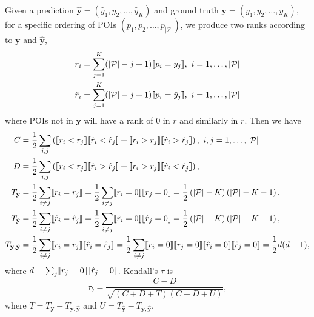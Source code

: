 Given a prediction $\hat{\mathbf{y}} = (\hat{y}_1, \hat{y}_2, \dots, \hat{y}_K)$ and ground truth $\mathbf{y} = (y_1, y_2, \dots, y_K)$,
for a specific ordering of POIs $(p_1, p_2, \dots, p_{|\mathcal{P}|})$,
we produce two ranks according to $\mathbf{y}$ and $\hat{\mathbf{y}}$,
\begin{align*}
r_i       &= \sum_{j=1}^K (| \mathcal{P} | - j + 1)  \llbracket p_i = y_j \rrbracket,~
i = 1, \dots, | \mathcal{P} | \\
\hat{r}_i &= \sum_{j=1}^K (| \mathcal{P} | - j + 1)  \llbracket p_i = \hat{y}_j \rrbracket,~ 
i = 1, \dots, | \mathcal{P} |
\end{align*}
where POIs not in $\mathbf{y}$ will have a rank of $0$ in $r$ and similarly in $r$.
Then we have
\begin{align*}
C &= \frac{1}{2} \sum_{i,j} \left(\llbracket r_i < r_j \rrbracket  \llbracket \hat{r}_i < \hat{r}_j \rrbracket +
     \llbracket r_i > r_j \rrbracket  \llbracket \hat{r}_i > \hat{r}_j \rrbracket \right), ~i,j = 1, \dots, | \mathcal{P} | \\
D &= \frac{1}{2} \sum_{i,j} \left(\llbracket r_i < r_j \rrbracket  \llbracket \hat{r}_i > \hat{r}_j \rrbracket +
     \llbracket r_i > r_j \rrbracket  \llbracket \hat{r}_i < \hat{r}_j \rrbracket \right), \\
T_{\mathbf{y}} &= \frac{1}{2} \sum_{i \ne j} \llbracket r_i = r_j \rrbracket 
                = \frac{1}{2} \sum_{i \ne j} \llbracket r_i = 0 \rrbracket  \llbracket r_j = 0 \rrbracket 
                = \frac{1}{2} \left( |\mathcal{P}| - K \right) \left( |\mathcal{P}| - K - 1 \right), \\ 
T_{\hat{\mathbf{y}}} &= \frac{1}{2} \sum_{i \ne j} \llbracket \hat{r}_i = \hat{r}_j \rrbracket
                      = \frac{1}{2} \sum_{i \ne j} \llbracket \hat{r}_i = 0 \rrbracket  \llbracket \hat{r}_j = 0 \rrbracket
                      = \frac{1}{2} \left( |\mathcal{P}| - K \right) \left( |\mathcal{P}| - K - 1 \right), \\ 
T_{\mathbf{y},\hat{\mathbf{y}}} &= \frac{1}{2} \sum_{i \ne j} \llbracket r_i = r_j \rrbracket  \llbracket \hat{r}_i = \hat{r}_j \rrbracket
                                 = \frac{1}{2} \sum_{i \ne j} \llbracket r_i = 0 \rrbracket  \llbracket r_j = 0 \rrbracket 
                                   \llbracket \hat{r}_i = 0 \rrbracket  \llbracket \hat{r}_j = 0 \rrbracket
                                 = \frac{1}{2} {d(d-1)},
\end{align*}
where $d = \sum_j \llbracket r_j = 0 \rrbracket  \llbracket \hat{r}_j = 0 \rrbracket$.
Kendall's $\tau$ is
\begin{equation*}
\tau_b = \frac{C - D}{\sqrt{(C + D + T) (C + D + U)}},
\end{equation*}
where $T = T_{\mathbf{y}} - T_{\mathbf{y},\hat{\mathbf{y}}}$ and $U = T_{\hat{\mathbf{y}}} - T_{\mathbf{y},\hat{\mathbf{y}}}$.
